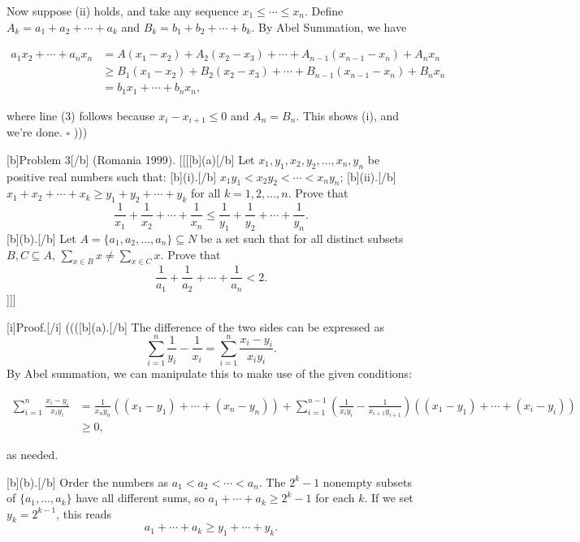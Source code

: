 Now suppose (ii) holds, and take any sequence $x_1 \leq \cdots \leq x_n$. Define $A_k = a_1 + a_2 + \cdots + a_k$ and $B_k = b_1 + b_2 + \cdots + b_k$. By Abel Summation, we have

$\begin{align*}
a_1 x_2 + \cdots + a_n x_n 
&= A(x_1 - x_2) + A_2(x_2 - x_3) + \cdots + A_{n-1}(x_{n-1} - x_n) + A_nx_n \\
&\geq B_1(x_1 - x_2) + B_2(x_2 - x_3) + \cdots + B_{n-1}(x_{n-1} - x_n) + B_n x_n \tag{3} \\
&= b_1 x_1 + \cdots + b_n x_n,
\end{align*}$

where line (3) follows because $x_i - x_{i+1} \leq 0$ and $A_n = B_n$. This shows (i), and we're done. $\square$  )))

[b]Problem 3[/b] (Romania 1999).  
[[[[b](a)[/b] Let $x_1, y_1, x_2, y_2, \ldots, x_n, y_n$ be positive real numbers such that:  
[b](i).[/b] $x_1 y_1 < x_2 y_2 < \cdots < x_n y_n$;  
[b](ii).[/b] $x_1 + x_2 + \cdots + x_k \geq y_1 + y_2 + \cdots + y_k$ for all $k = 1, 2, \ldots, n$. Prove that 
\[ \frac{1}{x_1} + \frac{1}{x_2} + \cdots + \frac{1}{x_n} \leq \frac{1}{y_1} + \frac{1}{y_2} + \cdots + \frac{1}{y_n}. \]  
[b](b).[/b] Let $A = \{a_1, a_2, \ldots, a_n\} \subseteq N$ be a set such that for all distinct subsets $B, C \subseteq A$, $\sum_{x \in B} x \neq \sum_{x \in C} x$. Prove that
\[ \frac{1}{a_1} + \frac{1}{a_2} + \cdots + \frac{1}{a_n} < 2. \]  ]]]

[i]Proof.[/i] ((([b](a).[/b] The difference of the two sides can be expressed as  
\[ \sum_{i=1}^n \frac{1}{y_i} - \frac{1}{x_i} = \sum_{i=1}^n \frac{x_i - y_i}{x_i y_i}. \]  
By Abel summation, we can manipulate this to make use of the given conditions:  

$\begin{align*}
\sum_{i=1}^n \frac{x_i - y_i}{x_i y_i}
&= \frac{1}{x_n y_n} ((x_1 - y_1) + \cdots + (x_n - y_n)) + \sum_{i=1}^{n-1} \left( \frac{1}{x_i y_i} - \frac{1}{x_{i+1}y_{i+1}} \right) ((x_1 - y_1) + \cdots + (x_i - y_i)) \\
&\geq 0,  
\end{align*}$

as needed.  


[b](b).[/b] Order the numbers as $a_1 < a_2 < \cdots < a_n$. The $2^k - 1$ nonempty subsets of $\{a_1, \ldots, a_k\}$ have all different sums, so $a_1 + \cdots + a_k \geq 2^k - 1$ for each $k$. If we set $y_k = 2^{k-1}$, this reads  
\[ a_1 + \cdots + a_k \geq y_1 + \cdots + y_k. \]  

